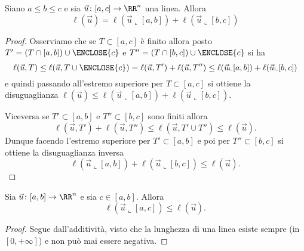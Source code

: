     \begin{theorem}
      Siano $a\le b \le c$ e sia $\vec u\colon [a,c]\to \RR^n$ una linea.
      Allora%
      \begin{equation}\label{eq:ell_additivo}
      \ell(\vec u ) = \ell(\vec u\llcorner[a,b]) + \ell(\vec u\llcorner[b,c])  
      \end{equation}
    \end{theorem}
    \begin{proof}
    Osserviamo che se $T\subset[a,c]$ è finito allora 
    posto $T'=(T\cap[a,b])\cup\ENCLOSE{c}$ e $T''=(T\cap[b,c])\cup \ENCLOSE{c}$
    si ha
    \[
    \ell(\vec u, T) \le \ell(\vec u, T\cup\ENCLOSE{c})
    =\ell(\vec u,T') + \ell(\vec u,T'')  
    \le \ell(\vec u\llcorner [a,b]) + \ell(\vec u\llcorner [b,c])
    \]
    e quindi passando all'estremo superiore per $T\subset [a,c]$ 
    si ottiene la disuguaglianza
    $\ell(\vec u)\le \ell(\vec u\llcorner [a,b]) + \ell(\vec u\llcorner[b,c])$.
    
    Viceversa se $T'\subset [a,b]$ e $T''\subset [b,c]$ sono finiti 
    allora 
    \[
     \ell(\vec u, T') + \ell(\vec u, T'')
     \le \ell(\vec u, T'\cup T'') \le \ell(\vec u).
    \]
    Dunque facendo l'estremo superiore per $T'\subset [a,b]$ 
    e poi per $T''\subset [b,c]$ si ottiene la disuguaglianza
    inversa
    \[
      \ell(\vec u\llcorner[a,b]) + \ell(\vec u\llcorner[b,c])
      \le \ell(\vec u).
    \]
    \end{proof}
    
    \begin{corollary}[monotonia]
    Sia $\vec u\colon[a,b]\to \RR^n$ e sia $c\in [a,b]$. Allora 
    \[
    \ell(\vec u \llcorner [a,c]) \le \ell(\vec u).  
    \]
    \end{corollary}
    \begin{proof}
    Segue dall'additività, visto che la lunghezza di una linea
    esiste sempre (in $[0,+\infty]$) e non può mai essere negativa.
    \end{proof}
    
